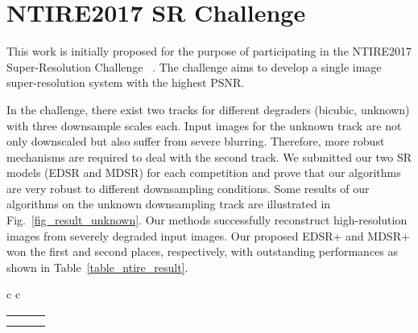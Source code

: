 \documentclass[10pt,twocolumn,letterpaper]{article}
\begin{document}
\begin{table}[t]
	
	\section{NTIRE2017 SR Challenge}
	
	This work is initially proposed for the purpose of participating in the NTIRE2017 Super-Resolution Challenge ~\cite{Timofte_2017_CVPR_Workshops}.
	The challenge aims to develop a single image super-resolution system with the highest PSNR. 


	In the challenge, there exist two tracks for different degraders (bicubic, unknown) with three downsample scales  each.
	Input images for the unknown track are not only downscaled but also suffer from severe blurring.
	Therefore, more robust mechanisms are required to deal with the second track.
	We submitted our two SR models (EDSR and MDSR) for each competition and prove that our algorithms are very robust to different downsampling conditions.
	Some results of our algorithms on the unknown downsampling track are illustrated in Fig.~\ref{fig_result_unknown}. Our methods successfully reconstruct high-resolution images from severely degraded input images.
	Our proposed EDSR+ and MDSR+ won the first and second places, respectively, with outstanding performances as shown in Table~\ref{table_ntire_result}. 
	\begin{figure*}[t]
		\captionsetup[subfloat]{labelformat=empty}
		\begin{center}
			\newcommand{\rowArg}{2.46cm}
			\newcommand{\fullSize}{5.56cm}
			\newcommand{\fullHalf}{2.78cm}
			\newcommand{\patchSize}{2.3cm}
			\scriptsize
			\setlength\tabcolsep{0.1cm}
			\begin{tabular}[b]{c c}
				\begin{tabular}[b]{c c c}
					\multirow{2}{*}[\rowArg]{
						\subfloat[0791 from DIV2K~\cite{Timofte_2017_CVPR_Workshops}]
						{\includegraphics[width = \fullHalf, height = \fullSize]
							{figs/val_0791_Full_cut.png}}} &
					\subfloat[HR \protect\linebreak(PSNR / SSIM)]
					{\includegraphics[width = \patchSize, height = \patchSize]
						{figs/val_0791_GT.png}} &
					\subfloat[Bicubic \protect\linebreak(22.20 dB / 0.7979)]
					{\includegraphics[width = \patchSize, height = \patchSize]
						{figs/val_0791_Bicubic.png}} \\ [-0.2cm] &
					\subfloat[\textbf{EDSR (Ours)} \protect\linebreak(\textcolor{red}{29.05 dB} / \textcolor{red}{0.9257})]

\end{tabular}
\end{tabular}
\end{center}
\end{figure*}
\end{table}
\end{document}
